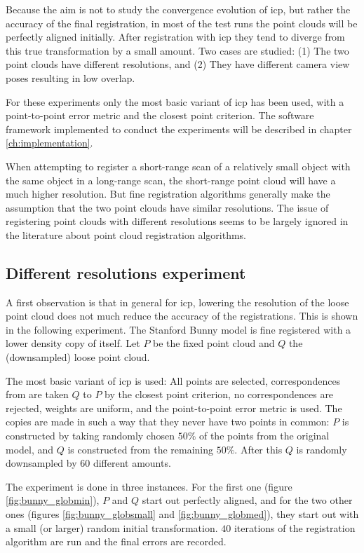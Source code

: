 Because the aim is not to study the convergence evolution of \gls{icp}, but rather the accuracy of the final registration, in most of the test runs the point clouds will be perfectly aligned initially. After registration with \gls{icp} they tend to diverge from this true transformation by a small amount. Two cases are studied: (1) The two point clouds have different resolutions, and (2) They have different camera view poses resulting in low overlap.

For these experiments only the most basic variant of \gls{icp} has been used, with a point-to-point error metric and the closest point criterion. The software framework implemented to conduct the experiments will be described in chapter \ref{ch:implementation}.

When attempting to register a short-range scan of a relatively small object with the same object in a long-range scan, the short-range point cloud will have a much higher resolution. But fine registration algorithms generally make the assumption that the two point clouds have similar resolutions. The issue of registering point clouds with different resolutions seems to be largely ignored in the literature about point cloud registration algorithms.

\subsection{Different resolutions experiment}
A first observation is that in general for \gls{icp}, lowering the resolution of the loose point cloud does not much reduce the accuracy of the registrations. This is shown in the following experiment. The Stanford Bunny model is fine registered with a lower density copy of itself. Let $P$ be the fixed point cloud and $Q$ the (downsampled) loose point cloud.

The most basic variant of \gls{icp} is used: All points are selected, correspondences from are taken $Q$ to $P$ by the closest point criterion, no correspondences are rejected, weights are uniform, and the point-to-point error metric is used. The copies are made in such a way that they never have two points in common: $P$ is constructed by taking randomly chosen $50\%$ of the points from the original model, and $Q$ is constructed from the remaining $50\%$. After this $Q$ is randomly downsampled by $60$ different amounts.

The experiment is done in three instances. For the first one (figure \ref{fig:bunny_globmin}), $P$ and $Q$ start out perfectly aligned, and for the two other ones (figures \ref{fig:bunny_globsmall} and \ref{fig:bunny_globmed}), they start out with a small (or larger) random initial transformation. $40$ iterations of the registration algorithm are run and the final errors are recorded.

